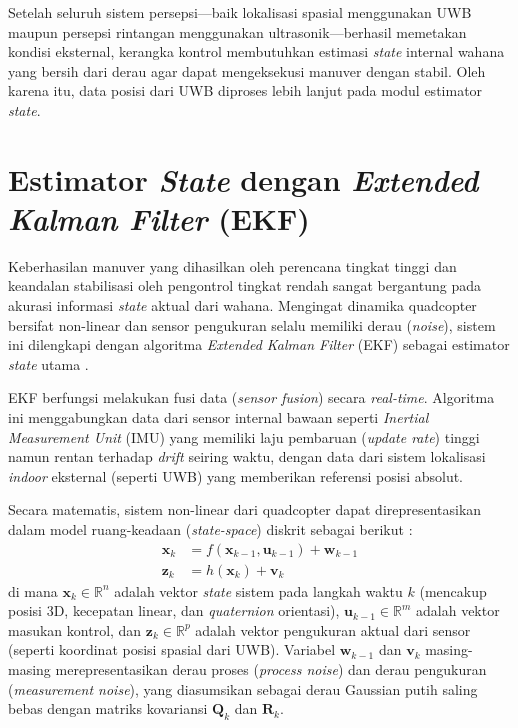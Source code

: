 \documentclass[12pt,a4paper]{report}
\numberwithin{equation}{chapter}
\begin{document}
Setelah seluruh sistem persepsi---baik lokalisasi spasial menggunakan UWB maupun persepsi rintangan menggunakan ultrasonik---berhasil memetakan kondisi eksternal, kerangka kontrol membutuhkan estimasi \textit{state} internal wahana yang bersih dari derau agar dapat mengeksekusi manuver dengan stabil. Oleh karena itu, data posisi dari UWB diproses lebih lanjut pada modul estimator \textit{state}.

\section{Estimator \textit{State} dengan \textit{Extended Kalman Filter} (EKF)}

Keberhasilan manuver yang dihasilkan oleh perencana tingkat tinggi dan keandalan stabilisasi oleh pengontrol tingkat rendah sangat bergantung pada akurasi informasi \textit{state} aktual dari wahana. Mengingat dinamika quadcopter bersifat non-linear dan sensor pengukuran selalu memiliki derau (\textit{noise}), sistem ini dilengkapi dengan algoritma \textit{Extended Kalman Filter} (EKF) sebagai estimator \textit{state} utama \cite{KalmanFilterGeneralizations2006}. 

EKF berfungsi melakukan fusi data (\textit{sensor fusion}) secara \textit{real-time}. Algoritma ini menggabungkan data dari sensor internal bawaan seperti \textit{Inertial Measurement Unit} (IMU) yang memiliki laju pembaruan (\textit{update rate}) tinggi namun rentan terhadap \textit{drift} seiring waktu, dengan data dari sistem lokalisasi \textit{indoor} eksternal (seperti UWB) yang memberikan referensi posisi absolut. 

Secara matematis, sistem non-linear dari quadcopter dapat direpresentasikan dalam model ruang-keadaan (\textit{state-space}) diskrit sebagai berikut \cite{welchIntroductionKalmanFilter2006}:
\begin{align}
    \mathbf{x}_k &= f(\mathbf{x}_{k-1}, \mathbf{u}_{k-1}) + \mathbf{w}_{k-1} \label{eq:ekf_system} \\
    \mathbf{z}_k &= h(\mathbf{x}_k) + \mathbf{v}_k \label{eq:ekf_measurement}
\end{align}
di mana $\mathbf{x}_k \in \mathbb{R}^n$ adalah vektor \textit{state} sistem pada langkah waktu $k$ (mencakup posisi 3D, kecepatan linear, dan \textit{quaternion} orientasi), $\mathbf{u}_{k-1} \in \mathbb{R}^m$ adalah vektor masukan kontrol, dan $\mathbf{z}_k \in \mathbb{R}^p$ adalah vektor pengukuran aktual dari sensor (seperti koordinat posisi spasial dari UWB). Variabel $\mathbf{w}_{k-1}$ dan $\mathbf{v}_k$ masing-masing merepresentasikan derau proses (\textit{process noise}) dan derau pengukuran (\textit{measurement noise}), yang diasumsikan sebagai derau Gaussian putih saling bebas dengan matriks kovariansi $\mathbf{Q}_k$ dan $\mathbf{R}_k$.
\end{document}
